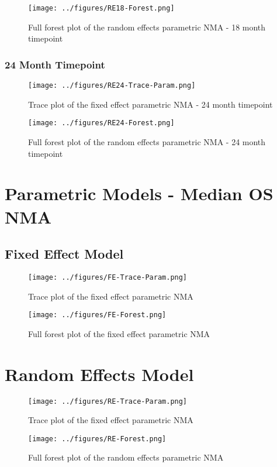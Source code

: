 \begin{figure}[h]
    \center
    \texttt{[image: ../figures/RE18-Forest.png]}
    \caption{Full forest plot of the random effects parametric NMA - 18 month timepoint}
    \label{fig:re_full_forest}
\end{figure}

\subsubsection{24 Month Timepoint}

\begin{figure}[h]
    \center
    \texttt{[image: ../figures/RE24-Trace-Param.png]}
    \caption{Trace plot of the fixed effect parametric NMA - 24 month timepoint}
    \label{fig:fe_trace_param}
\end{figure}

\begin{figure}[h]
    \center
    \texttt{[image: ../figures/RE24-Forest.png]}
    \caption{Full forest plot of the random effects parametric NMA - 24 month timepoint}
    \label{fig:re_full_forest}
\end{figure}

\section{Parametric Models - Median OS NMA}

\subsection{Fixed Effect Model}

\begin{figure}[h]
    \center
    \texttt{[image: ../figures/FE-Trace-Param.png]}
    \caption{Trace plot of the fixed effect parametric NMA}
    \label{fig:fe_trace_param}
\end{figure}

\begin{figure}[h]
    \center
    \texttt{[image: ../figures/FE-Forest.png]}
    \caption{Full forest plot of the fixed effect parametric NMA}
    \label{fig:fe_full_forest}
\end{figure}

\section{Random Effects Model}

\begin{figure}[h]
    \center
    \texttt{[image: ../figures/RE-Trace-Param.png]}
    \caption{Trace plot of the fixed effect parametric NMA}
    \label{fig:fe_trace_param}
\end{figure}

\begin{figure}[h]
    \center
    \texttt{[image: ../figures/RE-Forest.png]}
    \caption{Full forest plot of the random effects parametric NMA}
    \label{fig:re_full_forest}
\end{figure}

